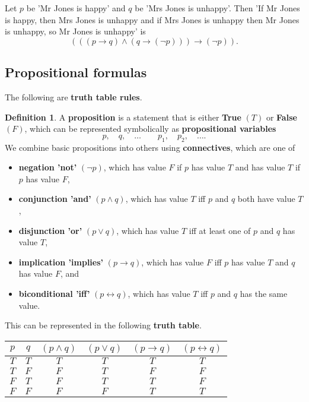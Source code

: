 \documentclass{article}
\newcommand{\rb}[1]{\left( #1 \right)}
\newcommand{\notb}[1]{\rb{\neg #1}}
\newcommand{\andb}[2]{\rb{#1 \land #2}}
\newcommand{\impb}[2]{\rb{#1 \rightarrow #2}}
\theoremstyle{definition}\newtheorem{definition}{Definition}[subsection]
\theoremstyle{definition}\newtheorem{remark}[definition]{Remark}
\theoremstyle{definition}\newtheorem*{example}{Example}
\theoremstyle{definition}\newtheorem*{note}{Note}
\begin{document}
Let $ p $ be 'Mr Jones is happy' and $ q $ be 'Mrs Jones is unhappy'. Then 'If Mr Jones is happy, then Mrs Jones is unhappy and if Mrs Jones is unhappy then Mr Jones is unhappy, so Mr Jones is unhappy' is
$$ \impb{\andb{\impb{p}{q}}{\impb{q}{\notb{p}}}}{\notb{p}}. $$

\subsection{Propositional formulas}

The following are \textbf{truth table rules}.

\begin{definition}
\label{def:1.1.1}
A \textbf{proposition} is a statement that is either \textbf{True} $ \rb{T} $ or \textbf{False} $ \rb{F} $, which can be represented symbolically as \textbf{propositional variables}
$$ p, \quad q, \quad \dots \qquad p_1, \quad p_2, \quad \dots. $$
We combine basic propositions into others using \textbf{connectives}, which are one of
\begin{itemize}
\item \textbf{negation 'not'} $ \rb{\neg p} $, which has value $ F $ if $ p $ has value $ T $ and has value $ T $ if $ p $ has value $ F $,
\item \textbf{conjunction 'and'} $ \rb{p \land q} $, which has value $ T $ iff $ p $ and $ q $ both have value $ T $,
\item \textbf{disjunction 'or'} $ \rb{p \lor q} $, which has value $ T $ iff at least one of $ p $ and $ q $ has value $ T $,
\item \textbf{implication 'implies'} $ \rb{p \rightarrow q} $, which has value $ F $ iff $ p $ has value $ T $ and $ q $ has value $ F $, and
\item \textbf{biconditional 'iff'} $ \rb{p \leftrightarrow q} $, which has value $ T $ iff $ p $ and $ q $ has the same value.
\end{itemize}
This can be represented in the following \textbf{truth table}.
\begin{center}
\begin{tabular}{|c|c|c|c|c|c|}
\hline
$ p $ & $ q $ & $ \rb{p \land q} $ & $ \rb{p \lor q} $ & $ \rb{p \rightarrow q} $ & $ \rb{p \leftrightarrow q} $ \\
\hline
$ T $ & $ T $ & $ T $ & $ T $ & $ T $ & $ T $ \\
\hline
$ T $ & $ F $ & $ F $ & $ T $ & $ F $ & $ F $ \\
\hline
$ F $ & $ T $ & $ F $ & $ T $ & $ T $ & $ F $ \\
\hline
$ F $ & $ F $ & $ F $ & $ F $ & $ T $ & $ T $ \\
\hline
\end{tabular}
\end{center}
\end{definition}
\end{document}
